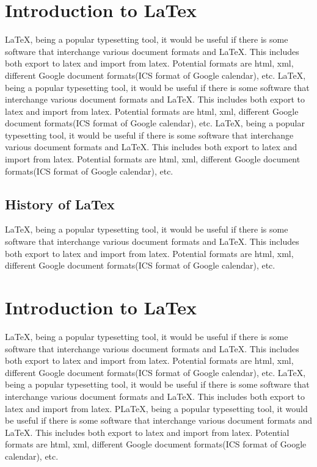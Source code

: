 \documentclass[a4paper,10pt]{mesreport}
\begin{document}
\section{Introduction to LaTex}
LaTeX, being a popular typesetting tool, it would be useful if there is some software that interchange
various document formats and LaTeX. This includes both export to latex and import from latex.
Potential formats are html, xml, different Google document formats(ICS format of Google calendar), etc.
LaTeX, being a popular typesetting tool, it would be useful if there is some software that interchange
various document formats and LaTeX. This includes both export to latex and import from latex.
Potential formats are html, xml, different Google document formats(ICS format of Google calendar), etc.
LaTeX, being a popular typesetting tool, it would be useful if there is some software that interchange
various document formats and LaTeX. This includes both export to latex and import from latex.
Potential formats are html, xml, different Google document formats(ICS format of Google calendar), etc.

\subsection{History of LaTex}

LaTeX, being a popular typesetting tool, it would be useful if there is some software that interchange
various document formats and LaTeX. This includes both export to latex and import from latex.
Potential formats are html, xml, different Google document formats(ICS format of Google calendar), etc.

\section{Introduction to LaTex}
LaTeX, being a popular typesetting tool, it would be useful if there is some software that interchange
various document formats and LaTeX. This includes both export to latex and import from latex.
Potential formats are html, xml, different Google document formats(ICS format of Google calendar), etc.
LaTeX, being a popular typesetting tool, it would be useful if there is some software that interchange
various document formats and LaTeX. This includes both export to latex and import from latex.
PLaTeX, being a popular typesetting tool, it would be useful if there is some software that interchange
various document formats and LaTeX. This includes both export to latex and import from latex.
Potential formats are html, xml, different Google document formats(ICS format of Google calendar), etc.
\end{document}
